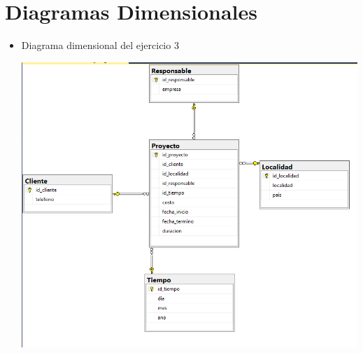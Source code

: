 \section{Diagramas Dimensionales} 

\begin{itemize}
	\item Diagrama dimensional del ejercicio 3
	\\
	\begin{center}
	\includegraphics[width=13cm]{./Imagenes/md_ejer3} 
	\end{center}



\end{itemize} 